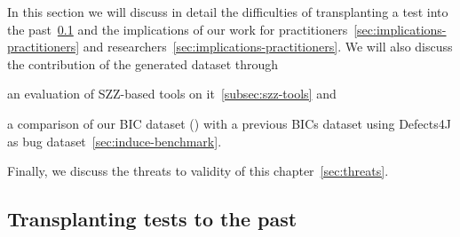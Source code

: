 
In this section we will discuss in detail the difficulties of transplanting a test into the past~\ref{sec:transplant-discuss} 
and the implications of our work for practitioners~\ref{sec:implications-practitioners} and researchers~\ref{sec:implications-practitioners}.
We will also discuss the contribution of the generated dataset through 
\begin{inparaenum}[\bf(1)]
    \item an evaluation of SZZ-based tools on it~\ref{subsec:szz-tools} and
    \item a comparison of our BIC dataset (\datasetName) with a previous BICs dataset using Defects4J as bug dataset~\ref{sec:induce-benchmark}.
\end{inparaenum}
Finally, we discuss the threats to validity of this chapter~\ref{sec:threats}.


\subsection{Transplanting tests to the past}
\label{sec:transplant-discuss}



